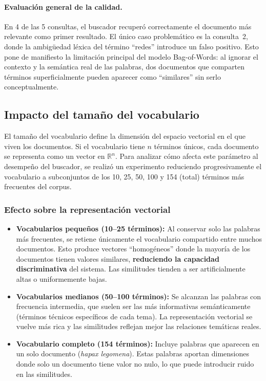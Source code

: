 \paragraph{Evaluación general de la calidad.}
En 4 de las 5 consultas, el buscador recuperó correctamente el documento más relevante como primer resultado. El único caso problemático es la consulta~2, donde la ambigüedad léxica del término ``redes'' introduce un falso positivo. Esto pone de manifiesto la limitación principal del modelo Bag-of-Words: al ignorar el contexto y la semántica real de las palabras, dos documentos que comparten términos superficialmente pueden aparecer como ``similares'' sin serlo conceptualmente.

\subsection{Impacto del tamaño del vocabulario}

El tamaño del vocabulario define la dimensión del espacio vectorial en el que viven los documentos. Si el vocabulario tiene $n$ términos únicos, cada documento se representa como un vector en $\mathbb{R}^n$. Para analizar cómo afecta este parámetro al desempeño del buscador, se realizó un experimento reduciendo progresivamente el vocabulario a subconjuntos de los 10, 25, 50, 100 y 154 (total) términos más frecuentes del corpus.

\subsubsection{Efecto sobre la representación vectorial}

\begin{itemize}
    \item \textbf{Vocabularios pequeños (10--25 términos):} Al conservar solo las palabras más frecuentes, se retiene únicamente el vocabulario compartido entre muchos documentos. Esto produce vectores ``homogéneos'' donde la mayoría de los documentos tienen valores similares, \textbf{reduciendo la capacidad discriminativa} del sistema. Las similitudes tienden a ser artificialmente altas o uniformemente bajas.

    \item \textbf{Vocabularios medianos (50--100 términos):} Se alcanzan las palabras con frecuencia intermedia, que suelen ser las más informativas semánticamente (términos técnicos específicos de cada tema). La representación vectorial se vuelve más rica y las similitudes reflejan mejor las relaciones temáticas reales.

    \item \textbf{Vocabulario completo (154 términos):} Incluye palabras que aparecen en un solo documento (\textit{hapax legomena}). Estas palabras aportan dimensiones donde solo un documento tiene valor no nulo, lo que puede introducir ruido en las similitudes.
\end{itemize}

